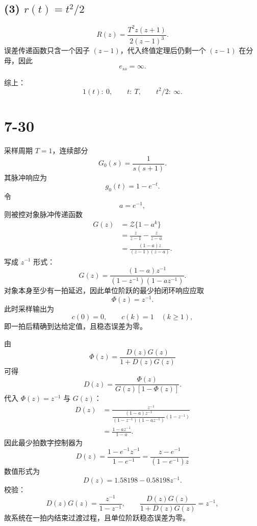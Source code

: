 \documentclass[UTF8,a4paper,11pt]{ctexart}
\begin{document}
\subsection*{(3) $r(t)=t^2/2$}
\[
R(z)=\frac{T^2z(z+1)}{2(z-1)^3}.
\]
误差传递函数只含一个因子 $(z-1)$，代入终值定理后仍剩一个 $(z-1)$ 在分母，因此
\[
\boxed{e_{ss}=\infty}.
\]

综上：
\[
\boxed{1(t):\ 0,\qquad t:\ T,\qquad t^2/2:\ \infty}.
\]

\section*{7-30}
采样周期 $T=1$，连续部分
\[
G_0(s)=\frac{1}{s(s+1)}.
\]
其脉冲响应为
\[
g_0(t)=1-e^{-t}.
\]
令
\[
a=e^{-1},
\]
则被控对象脉冲传递函数
\[
\begin{aligned}
G(z)
&=\mathcal Z\{1-a^k\}\\
&=\frac{z}{z-1}-\frac{z}{z-a}\\
&=\frac{(1-a)z}{(z-1)(z-a)}.
\end{aligned}
\]
写成 $z^{-1}$ 形式：
\[
G(z)=\frac{(1-a)z^{-1}}
{(1-z^{-1})(1-az^{-1})}.
\]
对象本身至少有一拍延迟，因此单位阶跃的最少拍闭环响应应取
\[
\boxed{\Phi(z)=z^{-1}}.
\]
此时采样输出为
\[
c(0)=0,\qquad c(k)=1\quad(k\ge1),
\]
即一拍后精确到达给定值，且稳态误差为零。

由
\[
\Phi(z)=\frac{D(z)G(z)}{1+D(z)G(z)}
\]
可得
\[
D(z)=\frac{\Phi(z)}{G(z)[1-\Phi(z)]}.
\]
代入 $\Phi(z)=z^{-1}$ 与 $G(z)$：
\[
\begin{aligned}
D(z)
&=\frac{z^{-1}}
{\dfrac{(1-a)z^{-1}}{(1-z^{-1})(1-az^{-1})}(1-z^{-1})}\\
&=\frac{1-az^{-1}}{1-a}.
\end{aligned}
\]
因此最少拍数字控制器为
\[
\boxed{
D(z)=\frac{1-e^{-1}z^{-1}}{1-e^{-1}}
=\frac{z-e^{-1}}{(1-e^{-1})z}}
\]
数值形式为
\[
\boxed{D(z)=1.58198-0.58198z^{-1}}.
\]
校验：
\[
D(z)G(z)=\frac{z^{-1}}{1-z^{-1}},
\qquad
\frac{D(z)G(z)}{1+D(z)G(z)}=z^{-1},
\]
故系统在一拍内结束过渡过程，且单位阶跃稳态误差为零。
\end{document}
